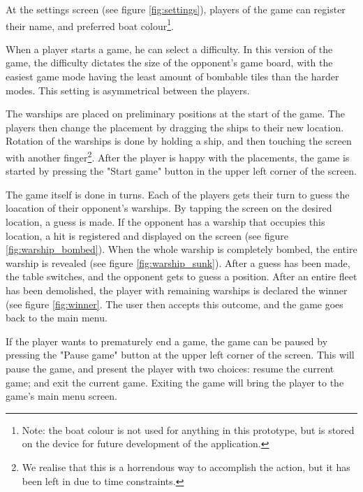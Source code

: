 At the settings screen (see figure \ref{fig:settings}), players of the game can register their name, and preferred boat colour\footnote{Note: the boat colour is not used for anything in this prototype, but is stored on the device for future development of the application.}. 

When a player starts a game, he can select a difficulty. In this version of the game, the difficulty dictates the size of the opponent's game board, with the easiest game mode having the least amount of bombable tiles than the harder modes. This setting is asymmetrical between the players.

The warships are placed on preliminary positions at the start of the game. The players then change the placement by dragging the ships to their new location. Rotation of the warships is done by holding a ship, and then touching the screen with another finger\footnote{We realise that this is a horrendous way to accomplish the action, but it has been left in due to time constraints.}. After the player is happy with the placements, the game is started by pressing the "Start game" button in the upper left corner of the screen.

The game itself is done in turns. Each of the players gets their turn to guess the loacation of their opponent's warships. By tapping the screen on the desired location, a guess is made. If the opponent has a warship that occupies this location, a hit is registered and displayed on the screen (see figure \ref{fig:warship_bombed}). When the whole warship is completely bombed, the entire warship is revealed (see figure \ref{fig:warship_sunk}). After a guess has been made, the table switches, and the opponent gets to guess a position. After an entire fleet has been demolished, the player with remaining warships is declared the winner (see figure \ref{fig:winner}. The user then accepts this outcome, and the game goes back to the main menu.

If the player wants to prematurely end a game, the game can be paused by pressing the "Pause game" button at the upper left corner of the screen. This will pause the game, and present the player with two choices: resume the current game; and exit the current game. Exiting the game will bring the player to the game's main menu screen.